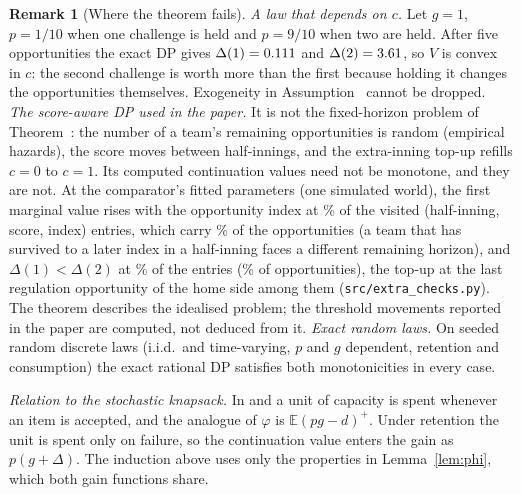 \documentclass[aoas]{imsart}
\theoremstyle{plain}
\theoremstyle{definition}
\newtheorem{remark}{Remark}
\newcommand{\E}{\mathbb{E}}
\begin{document}
\begin{remark}[Where the theorem fails]\label{rem:counter}
\emph{A law that depends on $c$.} Let $g=1$, $p=1/10$ when one challenge is held and $p=9/10$ when two are held.
After five opportunities the exact DP gives $\Delta(1)=0.111$ and $\Delta(2)=3.61$, so $V$ is convex in $c$:
the second challenge is worth more than the first because holding it changes the opportunities themselves. Exogeneity
in Assumption~ cannot be dropped.
\emph{The score-aware DP used in the paper.} It is not the fixed-horizon problem of Theorem~: the number
of a team's remaining opportunities is random (empirical hazards), the score moves between half-innings, and the
extra-inning top-up refills $c=0$ to $c=1$. Its computed continuation values need not be monotone, and they are not. At
the comparator's fitted parameters (one simulated world), the first marginal value rises with the opportunity index at
\DPRiseEntPct\% of the visited (half-inning, score, index) entries, which carry \DPRiseOppPct\% of the opportunities (a
team that has survived to a later index in a half-inning faces a different remaining horizon), and $\Delta(1)<\Delta(2)$
at \DPConcEntPct\% of the entries (\DPConcOppPct\% of opportunities), the top-up at the last regulation opportunity of
the home side among them (\nolinkurl{src/extra_checks.py}). The theorem describes the idealised problem; the threshold
movements reported in the paper are computed, not deduced from it.
\emph{Exact random laws.} On \SRandomLaws{} seeded random discrete laws (i.i.d.\ and time-varying, $p$ and $g$
dependent, retention and consumption) the exact rational DP satisfies both monotonicities in every case.
\end{remark}

\noindent\emph{Relation to the stochastic knapsack.} In \citet{DermanEtAl1972} and \citet{KleywegtPapastavrou1998} a
unit of capacity is spent whenever an item is accepted, and the analogue of $\varphi$ is $\E(pg-d)^+$. Under retention
the unit is spent only on failure, so the continuation value enters the gain as $p(g+\Delta)$. The induction above
uses only the properties in Lemma~\ref{lem:phi}, which both gain functions share.
\end{document}

